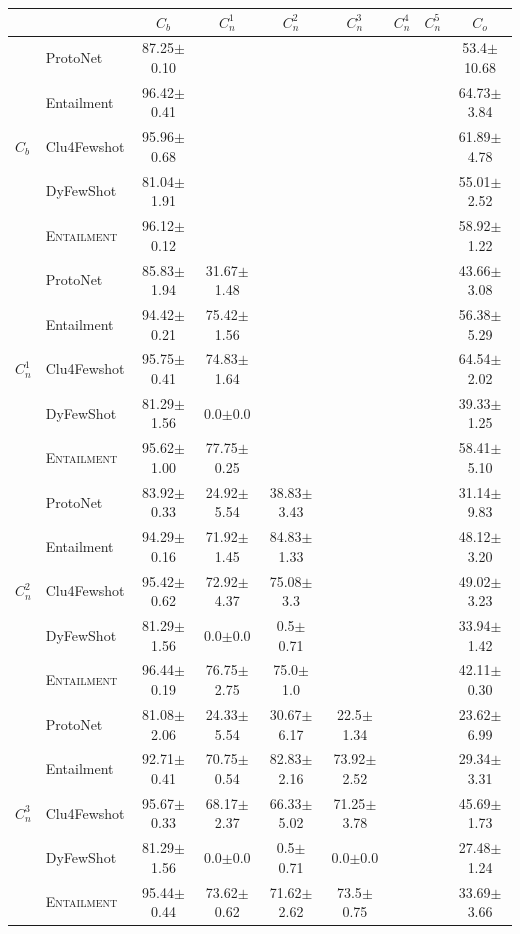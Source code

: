 \documentclass[11pt]{article}
\newcommand{\modelname}{\textsc{Entailment}}
\begin{document}
\begin{table}[t]
\setlength{\tabcolsep}{4.5pt}
\small
  \centering
  \begin{tabular}{ll|c|c|c|c|c|c|c}
 & & $C_b$ & $C_n^1$ & $C_n^2$ & $C_n^3$ & $C_n^4$ & $C_n^5$ & $C_o$\\\hline\hline 
\multirow{5}{*}{$C_b$} & ProtoNet & 87.25$\pm$0.10 & & & & & &53.4$\pm$10.68\\
  &  Entailment & 96.42$\pm$0.41 & & & & & & 64.73$\pm$3.84\\
  &  Clu4Fewshot & 95.96$\pm$0.68& & & & & & 61.89$\pm$4.78 \\
  & DyFewShot & 81.04$\pm$1.91  & & & & & & 55.01$\pm$2.52 \\
  &  \modelname &96.12$\pm$0.12 & & & & & &58.92$\pm$1.22 \\\hline
  
 \multirow{5}{*}{$C_n^1$} & ProtoNet & 85.83$\pm$1.94 &31.67$\pm$1.48 & & & & & 43.66$\pm$3.08\\
   &  Entailment & 94.42$\pm$0.21 &75.42$\pm$1.56 & & & & & 56.38$\pm$5.29\\
  &  Clu4Fewshot & 95.75$\pm$0.41& 74.83$\pm$1.64& & & & &64.54$\pm$2.02\\
  & DyFewShot & 81.29$\pm$1.56  &  0.0$\pm$0.0 & & & & & 39.33$\pm$1.25 \\
  &  \modelname & 95.62$\pm$1.00& 77.75$\pm$0.25& & & & & 58.41$\pm$5.10\\\hline
  
 \multirow{5}{*}{$C_n^2$} & ProtoNet & 83.92$\pm$0.33 &24.92$\pm$5.54 &38.83$\pm$3.43 & & & & 31.14$\pm$9.83\\
    &  Entailment & 94.29$\pm$0.16 &71.92$\pm$1.45 &84.83$\pm$1.33 & & & & 48.12$\pm$3.20\\
  &  Clu4Fewshot  &95.42$\pm$0.62 &72.92$\pm$4.37 & 75.08$\pm$3.3& & & & 49.02$\pm$3.23\\
  & DyFewShot & 81.29$\pm$1.56 & 0.0$\pm$0.0 & 0.5$\pm$0.71 & & & & 33.94$\pm$1.42 \\
  &  \modelname &96.44$\pm$0.19 &76.75$\pm$2.75& 75.0$\pm$1.0& & & & 42.11$\pm$0.30\\\hline
  
 \multirow{5}{*}{$C_n^3$} & ProtoNet & 81.08$\pm$2.06 &24.33$\pm$5.54 &30.67$\pm$6.17 &22.5$\pm$1.34 & & & 23.62$\pm$6.99\\
 & Entailment & 92.71$\pm$0.41& 70.75$\pm$0.54&82.83$\pm$2.16 &73.92$\pm$2.52 & & &  29.34$\pm$3.31\\
  &  Clu4Fewshot &95.67$\pm$0.33 & 68.17$\pm$2.37&66.33$\pm$5.02 &71.25$\pm$3.78 & & & 45.69$\pm$1.73 \\
  & DyFewShot & 81.29$\pm$1.56 & 0.0$\pm$0.0 & 0.5$\pm$0.71 & 0.0$\pm$0.0 & &  &27.48$\pm$1.24 \\
  &  \modelname& 95.44$\pm$0.44& 73.62$\pm$0.62&71.62$\pm$2.62 &73.5$\pm$0.75 & & & 33.69$\pm$3.66 \\\hline
  

\end{tabular}
\end{table}
\end{document}
